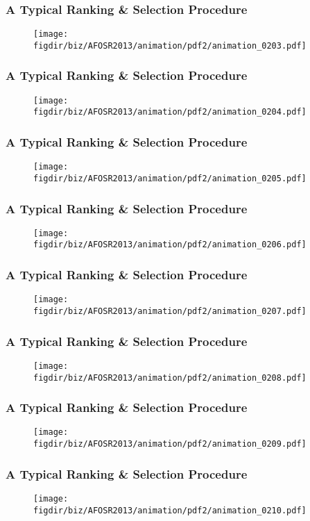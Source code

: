 \documentclass[13pt]{beamer}
\newcommand{\figdir}{../../fig}
\begin{document}
{\begin{frame}\frametitle{A Typical Ranking \& Selection Procedure}\begin{figure}\texttt{[image: \\figdir/biz/AFOSR2013/animation/pdf2/animation\_0203.pdf]}\end{figure}\end{frame}
\begin{frame}\frametitle{A Typical Ranking \& Selection Procedure}\begin{figure}\texttt{[image: \\figdir/biz/AFOSR2013/animation/pdf2/animation\_0204.pdf]}\end{figure}\end{frame}
\begin{frame}\frametitle{A Typical Ranking \& Selection Procedure}\begin{figure}\texttt{[image: \\figdir/biz/AFOSR2013/animation/pdf2/animation\_0205.pdf]}\end{figure}\end{frame}
\begin{frame}\frametitle{A Typical Ranking \& Selection Procedure}\begin{figure}\texttt{[image: \\figdir/biz/AFOSR2013/animation/pdf2/animation\_0206.pdf]}\end{figure}\end{frame}
\begin{frame}\frametitle{A Typical Ranking \& Selection Procedure}\begin{figure}\texttt{[image: \\figdir/biz/AFOSR2013/animation/pdf2/animation\_0207.pdf]}\end{figure}\end{frame}
\begin{frame}\frametitle{A Typical Ranking \& Selection Procedure}\begin{figure}\texttt{[image: \\figdir/biz/AFOSR2013/animation/pdf2/animation\_0208.pdf]}\end{figure}\end{frame}
\begin{frame}\frametitle{A Typical Ranking \& Selection Procedure}\begin{figure}\texttt{[image: \\figdir/biz/AFOSR2013/animation/pdf2/animation\_0209.pdf]}\end{figure}\end{frame}
\begin{frame}\frametitle{A Typical Ranking \& Selection Procedure}\begin{figure}\texttt{[image: \\figdir/biz/AFOSR2013/animation/pdf2/animation\_0210.pdf]}\end{figure}\end{frame}
}
\end{document}
